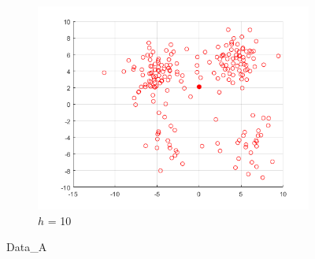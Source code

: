 \documentclass[12pt]{article}
\begin{document}
\begin{figure}[H]
\begin{subfigure}{0.25\textwidth}
  \includegraphics[width=\linewidth]{figs/1-b-meanshift-a-10.png}
  \caption{$h$ = 10}
  \label{fig:6}
\end{subfigure}
\caption{Data\_A}
\label{fig:images}
\end{figure}
\end{document}
